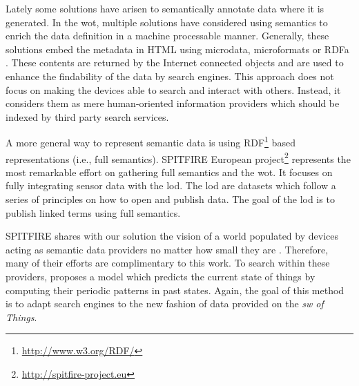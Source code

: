

Lately some solutions have arisen to semantically annotate data where it is generated. %
In the \acl{wot}, multiple solutions have considered using semantics to enrich the data definition in a machine processable manner.
Generally, these solutions embed the metadata in HTML using microdata, microformats or RDFa \citep{mayer_extensible_2011}.
These contents are returned by the Internet connected objects and are used to enhance the findability of the data by search engines.
This approach does not focus on making the devices able to search and interact with others.
Instead, it considers them as mere human-oriented information providers which should be indexed by third party search services.

A more general way to represent semantic data is using RDF\footnote{\url{http://www.w3.org/RDF/}} based representations (i.e., full semantics).
SPITFIRE European project\footnote{\url{http://spitfire-project.eu}} represents the most remarkable effort on gathering full semantics and the \ac{wot}.
It focuses on fully integrating sensor data with the \ac{lod}. 
The \ac{lod} are datasets which follow a series of principles on how to open and publish data.
The goal of the \ac{lod} is to publish linked terms using full semantics.

SPITFIRE shares with our solution the vision of a world populated by devices acting as semantic data providers no matter how small they are \citep{hasemann_rdf_2012}.
Therefore, many of their efforts are complimentary to this work.
To search within these providers, \citet{pfisterer_spitfire:_2011} proposes a model which predicts the current state of things by computing their periodic patterns in past states.
Again, the goal of this method is to adapt search engines to the new fashion of data provided on the \emph{\acl{sw} of Things}.

